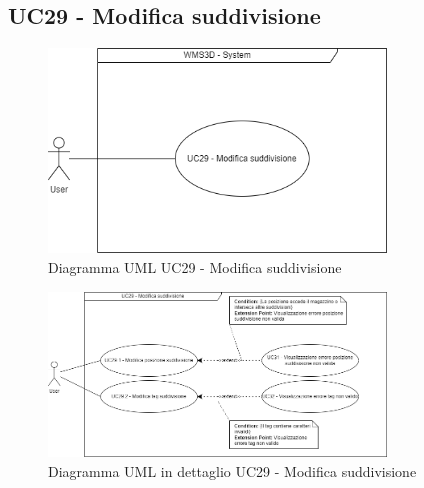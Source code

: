 \subsection{UC29 - Modifica suddivisione}
\begin{figure}[H]
  \centering
  \includegraphics[width=0.8\textwidth]{UC_diagrams_28-32/UC29_sys.drawio.png}
   \caption{Diagramma UML UC29 - Modifica suddivisione}
\end{figure}
\begin{figure}[H]
  \centering
  \includegraphics[width=0.8\textwidth]{UC_diagrams_28-32/UC29.drawio.png}
   \caption{Diagramma UML in dettaglio UC29 - Modifica suddivisione}
\end{figure}

%
%

